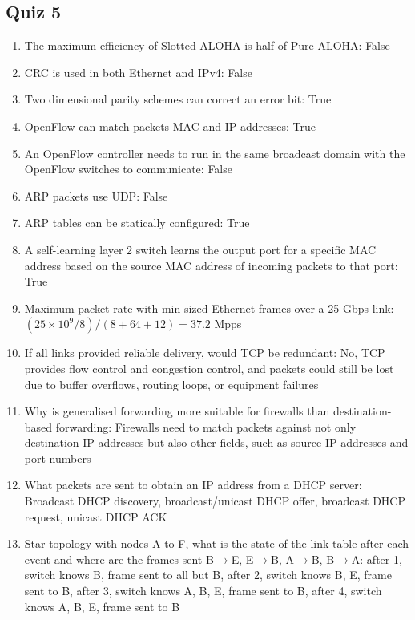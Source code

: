 \subsection{Quiz 5}
\begin{enumerate}
	\itemsep-0.5em
	\item The maximum efficiency of Slotted ALOHA is half of Pure ALOHA: False
	\item CRC is used in both Ethernet and IPv4: False
	\item Two dimensional parity schemes can correct an error bit: True
	\item OpenFlow can match packets MAC and IP addresses: True
	\item An OpenFlow controller needs to run in the same broadcast domain with the OpenFlow switches to communicate: False
	\item ARP packets use UDP: False
	\item ARP tables can be statically configured: True
	\item A self-learning layer 2 switch learns the output port for a specific MAC address based on the source MAC address of incoming packets to that port: True
	\item Maximum packet rate with min-sized Ethernet frames over a 25 Gbps link: $(25\times10^9/8)/(8+64+12)=37.2$ Mpps
	\item If all links provided reliable delivery, would TCP be redundant: No, TCP provides flow control and congestion control, and packets could still be lost due to buffer overflows, routing loops, or equipment failures
	\item Why is generalised forwarding more suitable for firewalls than destination-based forwarding: Firewalls need to match packets against not only destination IP addresses but also other fields, such as source IP addresses and port numbers
	\item What packets are sent to obtain an IP address from a DHCP server: Broadcast DHCP discovery, broadcast/unicast DHCP offer, broadcast DHCP request, unicast DHCP ACK
	\item Star topology with nodes A to F, what is the state of the link table after each event and where are the frames sent B$\rightarrow$E, E$\rightarrow$B, A$\rightarrow$B, B$\rightarrow$A: after 1, switch knows B, frame sent to all but B, after 2, switch knows B, E, frame sent to B, after 3, switch knows A, B, E, frame sent to B, after 4, switch knows A, B, E, frame sent to B
\end{enumerate}

